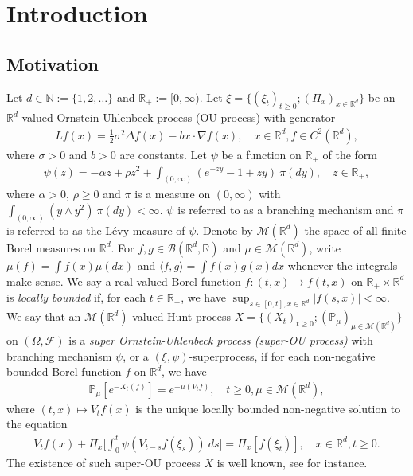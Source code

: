 \documentclass[12pt,a4paper]{amsart}
\theoremstyle{plain}
\theoremstyle{definition}
\numberwithin{equation}{section}
\begin{document}
\section{Introduction}
\subsection{Motivation}
\label{subsec:M}
Let $d \in \mathbb N:= \{1,2,\dots\}$ and $\mathbb R_+:= [0,\infty)$.
Let $\xi=\{(\xi_t)_{t\geq 0}; (\Pi_x)_{x\in \mathbb R^d}\}$ be an $\mathbb R^d$-valued Ornstein-Uhlenbeck process (OU process) with generator
\begin{align}
  Lf(x)
  = \frac{1}{2}\sigma^2\Delta f(x)-b x \cdot \nabla f(x)
  , \quad  x\in \mathbb R^d, f \in C^2(\mathbb R^d),
\end{align}
where $\sigma > 0$ and $b > 0$ are constants.
Let $\psi$ be a function on $\mathbb R_+$ of the form
\begin{align}
  \label{eq: honogeneou branching mechanism}
  \psi(z)
  =- \alpha z + \rho z^2 + \int_{(0,\infty)} (e^{-zy} - 1 + zy)~\pi(dy)
  , \quad  z \in \mathbb R_+,
\end{align}
where $\alpha > 0 $, $\rho \geq0$ and $\pi$ is a measure on $(0,\infty)$ with $\int_{(0,\infty)}(y\wedge y^2)~\pi(dy)< \infty$.
$\psi$ is referred to as a branching mechanism and $\pi$ is referred to as the L\'evy measure of $\psi$.
Denote by $\mathcal M(\mathbb R^d)$ the space of all finite Borel measures on $\mathbb R^d$.
For $f,g\in \mathcal B(\mathbb R^d, \mathbb R)$ and $\mu \in \mathcal M(\mathbb R^d)$,
 write $\mu(f)= \int f(x)\mu(dx)$
and $\langle f, g\rangle = \int f(x)g(x) dx$ whenever the integrals make sense.
We say a real-valued Borel function $f:(t,x)\mapsto f(t,x)$ on $\mathbb R_+\times \mathbb R^d$ is \emph{locally bounded} if, for each $t\in \mathbb R_+$, we have $ \sup_{s\in [0,t],x\in \mathbb R^d} |f(s,x)|<\infty. $
We say that an $\mathcal M(\mathbb R^d)$-valued Hunt process $X = \{(X_t)_{t\geq 0}; (\mathbb{P}_{\mu})_{\mu \in \mathcal M(\mathbb R^d)}\}$
on  $(\Omega, \mathscr{F})$
is a \emph{super Ornstein-Uhlenbeck process (super-OU process)} with branching mechanism $\psi$, or a $(\xi, \psi)$-superprocess, if for each non-negative bounded Borel function $f$ on $\mathbb R^d$, we have
\begin{align}
  \label{eq: def of V_t}
  \mathbb{P}_{\mu}[e^{-X_t(f)}]
  = e^{-\mu(V_tf)}
  , \quad t\geq 0, \mu \in \mathcal M(\mathbb R^d),
\end{align}
where $(t,x) \mapsto V_tf(x)$ is the unique locally bounded non-negative solution to the equation
\begin{align}
  V_tf(x) + \Pi_x \Big[ \int_0^t\psi (V_{t-s}f(\xi_s) )~ds\Big]
	= \Pi_x [f(\xi_t)]
  , \quad x\in \mathbb R^d, t\geq 0.
\end{align}	
The existence of such super-OU process $X$ is well known, see \cite{Dynkin1993Superprocesses} for instance.
\end{document}
